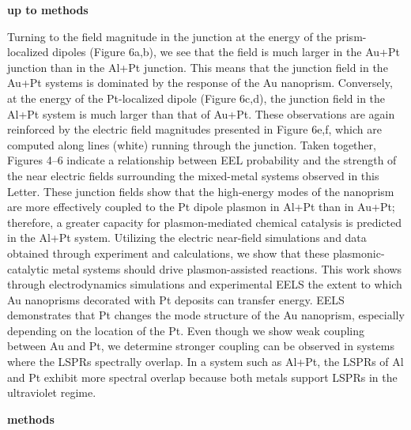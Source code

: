 \documentclass [11pt, proquest] {uwthesis}[2016/11/22]
\begin{document}
{\bf up to methods}

Turning to the field magnitude in the junction at the energy of the prism-localized dipoles (Figure 6a,b), we see that the field is much larger in the Au+Pt junction than in the Al+Pt junction. This means that the junction field in the Au+Pt systems is dominated by the response of the Au nanoprism. Conversely, at the energy of the Pt-localized dipole (Figure 6c,d), the junction field in the Al+Pt system is much larger than that of Au+Pt. These observations are again reinforced by the electric field magnitudes presented in Figure 6e,f, which are computed along lines (white) running through the junction. Taken together, Figures 4–6 indicate a relationship between EEL probability and the strength of the near electric fields surrounding the mixed-metal systems observed in this Letter. These junction fields show that the high-energy modes of the nanoprism are more effectively coupled to the Pt dipole plasmon in Al+Pt than in Au+Pt; therefore, a greater capacity for plasmon-mediated chemical catalysis is predicted in the Al+Pt system. Utilizing the electric near-field simulations and data obtained through experiment and calculations, we show that these plasmonic-catalytic metal systems should drive plasmon-assisted reactions.
This work shows through electrodynamics simulations and experimental EELS the extent to which Au nanoprisms decorated with Pt deposits can transfer energy. EELS demonstrates that Pt changes the mode structure of the Au nanoprism, especially depending on the location of the Pt. Even though we show weak coupling between Au and Pt, we determine stronger coupling can be observed in systems where the LSPRs spectrally overlap. In a system such as Al+Pt, the LSPRs of Al and Pt exhibit more spectral overlap because both metals support LSPRs in the ultraviolet regime.

{\bf methods}
\end{document}
